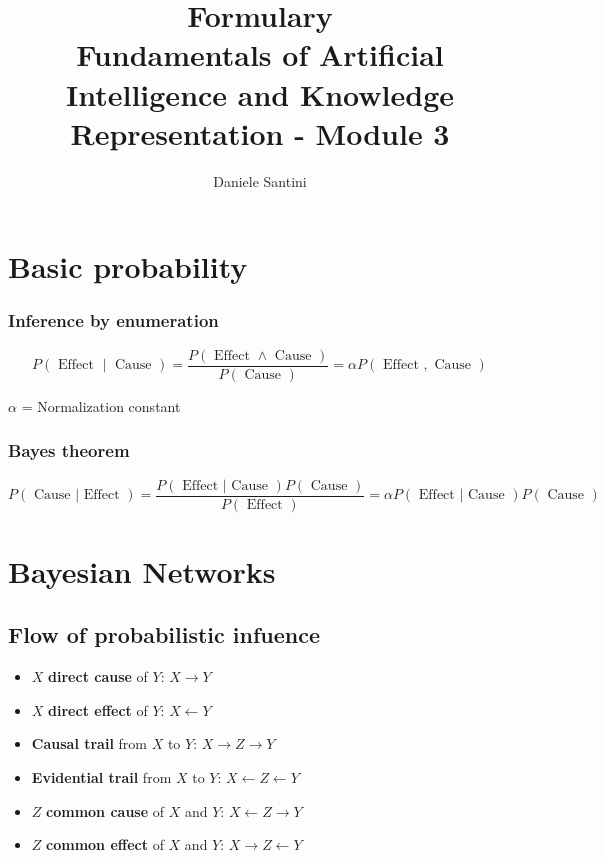 \documentclass[]{article}
\title{Formulary \\ \large Fundamentals of Artificial Intelligence and Knowledge Representation - Module 3}
\author{Daniele Santini}
\begin{document}

\section{Basic probability}

\subsubsection{Inference by enumeration}
$$
P(\text { Effect } \mid \text { Cause })=\frac{P(\text { Effect } \wedge \text { Cause })}{P(\text { Cause })}=\alpha P(\text { Effect }, \text { Cause })
$$

$\alpha$ = Normalization constant

\subsubsection{Bayes theorem}
$$
P(\text { Cause } | \text { Effect })=\frac{P(\text { Effect } | \text { Cause }) P( \text{ Cause })}{P(\text { Effect })}=\alpha P(\text { Effect } | \text { Cause }) P( \text{ Cause })
$$

\section{Bayesian Networks}

\subsection{Flow of probabilistic infuence}

\begin{itemize}
	\item $X$ \textbf{direct cause} of $Y$: $X \rightarrow Y$
	\item $X$ \textbf{direct effect} of $Y$: $X \leftarrow Y$
	\item \textbf{Causal trail} from $X$ to $Y$: $X \rightarrow Z \rightarrow Y$
	\item \textbf{Evidential trail} from $X$ to $Y$: $X \leftarrow Z \leftarrow Y$
	\item $Z$ \textbf{common cause} of $X$ and $Y$: $X \leftarrow Z \rightarrow Y$
	\item $Z$ \textbf{common effect} of $X$ and $Y$: $X \rightarrow Z \leftarrow Y$
\end{itemize}
\end{document}
